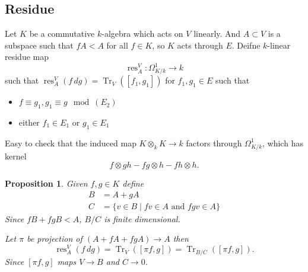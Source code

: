 \documentclass[leqno]{amsart}
\DeclareMathOperator{\mtr}{Tr}
\newcommand{\1}{\mathbf{1}}
\DeclareMathOperator{\res}{res}
\newtheorem{prop}[thm]{Proposition}
\theoremstyle{definition}
\theoremstyle{remark}
\begin{document}
\subsection{Residue}

Let $K$ be a commutative  $k$-algebra 
which acts on  $V$ linearly.
And  $A\subset V$ is a subspace
such that  $fA<A$ for all  $f\in K$,
so  $K$ acts through  $E$.
Deifne $k$-linear residue map
 \[
	\res_{A}^V\colon \Omega^1_{K/k}\to k
\]
such that $\res_A^V(f\,dg)=\mtr_V([f_1,g_1])$
for  $f_1,g_1\in E$ such that
 \begin{itemize}
	 \item $f\equiv g_1, g_1\equiv g\mod (E_2)$
	 \item either $f_1\in E_1$ or $g_1\in E_1$ 
\end{itemize}
Easy to check that the induced map
$K\otimes_kK\to k$
factors through  $\Omega^1_{K/k}$,
which has kernel
\[
	f\otimes gh-fg\otimes h-fh\otimes h.
\]

\begin{prop}
	Given $f,g\in K$
	define 
	\begin{align*}
		B&=A+gA\\
		C&=\{v\in B\mid fv\in A \text{ and } fgv\in A\}
	\end{align*}
	Since $fB+fgB<A$,
	$B/C$ is finite dimensional.

	Let $\pi$ be projection of $(A+fA+fgA)\to A$
	then 
	\[
		\res_A^V(f\,dg)=\mtr_{V}([\pi f,g])
		=\mtr_{B/C}([\pi f,g]).
	\]
	Since $[\pi f,g]$ maps $V\to B$
	and $C\to 0$.
\end{prop}
\end{document}
